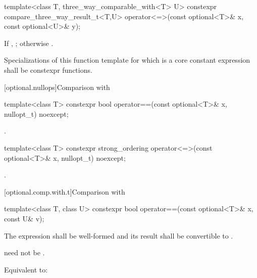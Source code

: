 %
\begin{itemdecl}
template<class T, three_way_comparable_with<T> U>
  constexpr compare_three_way_result_t<T,U>
    operator<=>(const optional<T>& x, const optional<U>& y);
\end{itemdecl}

\begin{itemdescr}
\pnum
\returns
If , ; otherwise .

\pnum
\remarks
Specializations of this function template
for which  is a core constant expression
shall be constexpr functions.
\end{itemdescr}

[optional.nullops]{Comparison with }

%
\begin{itemdecl}
template<class T> constexpr bool operator==(const optional<T>& x, nullopt_t) noexcept;
\end{itemdecl}

\begin{itemdescr}
\pnum
\returns
{}.
\end{itemdescr}

%
\begin{itemdecl}
template<class T> constexpr strong_ordering operator<=>(const optional<T>& x, nullopt_t) noexcept;
\end{itemdecl}

\begin{itemdescr}
\pnum
\returns
{}.
\end{itemdescr}

[optional.comp.with.t]{Comparison with }

%
\begin{itemdecl}
template<class T, class U> constexpr bool operator==(const optional<T>& x, const U& v);
\end{itemdecl}

\begin{itemdescr}
\pnum
\requires
The expression  shall be well-formed and
its result shall be convertible to .
\begin{note}
 need not be .
\end{note}

\pnum
\effects
Equivalent to: 
\end{itemdescr}

